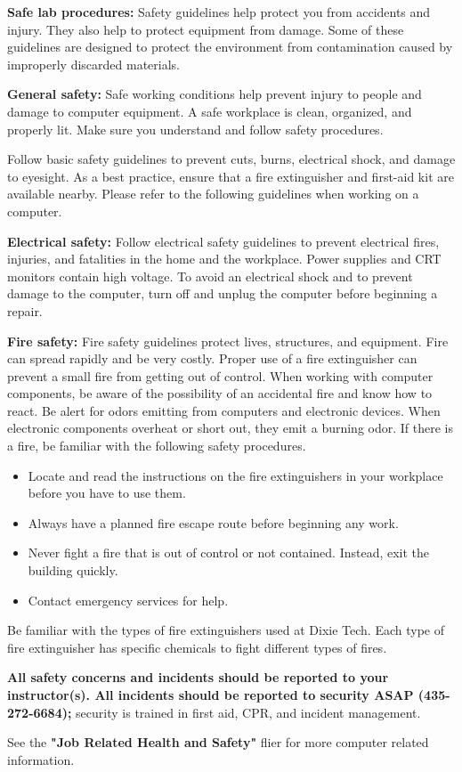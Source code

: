 \textbf{Safe lab procedures:} Safety guidelines help protect you from accidents and injury. They also help to
protect equipment from damage. Some of these guidelines are designed to protect the environment from
contamination caused by improperly discarded materials.
\par
\bigskip
\textbf{General safety:} Safe working conditions help prevent injury to people and damage to computer
equipment. A safe workplace is clean, organized, and properly lit. Make sure you understand and follow
safety procedures.
\par
\bigskip
Follow basic safety guidelines to prevent cuts, burns, electrical shock, and damage to eyesight. As a
best practice, ensure that a fire extinguisher and first-aid kit are available nearby. Please refer to the
following guidelines when working on a computer.
\par
\bigskip
\textbf{Electrical safety:} Follow electrical safety guidelines to prevent electrical fires, injuries, and fatalities
in the home and the workplace. Power supplies and CRT monitors contain high voltage. To avoid an
electrical shock and to prevent damage to the computer, turn off and unplug the computer before
beginning a repair.
\par
\bigskip
\textbf{Fire safety:} Fire safety guidelines protect lives, structures, and equipment. Fire can spread rapidly and
be very costly. Proper use of a fire extinguisher can prevent a small fire from getting out of control. When
working with computer components, be aware of the possibility of an accidental fire and know how to
react. Be alert for odors emitting from computers and electronic devices. When electronic components
overheat or short out, they emit a burning odor. If there is a fire, be familiar with the following safety
procedures.
\par
\bigskip
\begin{itemize}
    \item Locate and read the instructions on the fire extinguishers in your workplace before you have to use them.
    \item Always have a planned fire escape route before beginning any work.
    \item Never fight a fire that is out of control or not contained. Instead, exit the building quickly.
    \item Contact emergency services for help.
\end{itemize}
\par
\bigskip
Be familiar with the types of fire extinguishers used at Dixie Tech. Each type of fire extinguisher has
specific chemicals to fight different types of fires.
\par
\bigskip
\textbf{All safety concerns and incidents should be reported to your instructor(s). All incidents should
be reported to security ASAP (435-272-6684);} security is trained in first aid, CPR, and incident management.
\par
\bigskip
See the \textbf{"Job Related Health and Safety"} flier for more computer related information.
